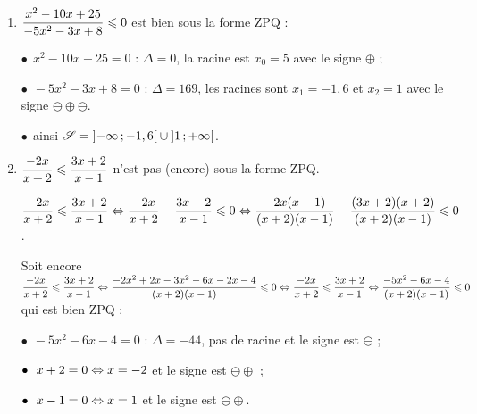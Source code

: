 \documentclass[a4paper,11pt]{article}
\begin{document}
\begin{enumerate}
	\item $\dfrac{x^2-10x+25}{-5x^2-3x+8} \leqslant 0$ est bien sous la forme \textsf{ZPQ} :
	
	\tabula{}$\bullet~~x^2-10x+25=0$ : $\Delta=0$, la racine est $x_0=5$ avec le signe $\oplus$ ;
	
	\tabula{}$\bullet~~-5x^2-3x+8=0$ : $\Delta=169$, les racines sont $x_1=-1,6$ et $x_2=1$ avec le signe $\ominus\oplus\ominus$.
	
	\begin{center}
	\end{center}
	
	\tabula{}$\bullet~~$ainsi $\mathscr{S}=\mbox{\ensuremath{\left]-\infty\mathpunct{};-1,6\right[}} \cup \mbox{\ensuremath{\left]1\mathpunct{};+\infty\right[}}$.
	\item $\dfrac{-2x}{x+2} \leqslant \dfrac{3x+2}{x-1}$ n'est pas (encore) sous la forme \textsf{ZPQ}.
	
	$\dfrac{-2x}{x+2} \leqslant \dfrac{3x+2}{x-1} \Leftrightarrow \dfrac{-2x}{x+2}-\dfrac{3x+2}{x-1} \leqslant 0 \Leftrightarrow \dfrac{-2x(x-1)}{(x+2)(x-1)}-\dfrac{(3x+2)(x+2)}{(x+2)(x-1)} \leqslant 0$.
	
	Soit encore $\dfrac{-2x}{x+2} \leqslant \dfrac{3x+2}{x-1} \Leftrightarrow \dfrac{-2x^2+2x-3x^2-6x-2x-4}{(x+2)(x-1)} \leqslant 0 \Leftrightarrow \dfrac{-2x}{x+2} \leqslant \dfrac{3x+2}{x-1} \Leftrightarrow \dfrac{-5x^2-6x-4}{(x+2)(x-1)} \leqslant 0$ qui est bien \textsf{ZPQ} :
	
	\tabula{}$\bullet~~-5x^2-6x-4=0$ : $\Delta=-44$, pas de racine et le signe est $\ominus$ ;
	
	\tabula{}$\bullet~~x+2=0 \Leftrightarrow x=-2$ et le signe est $\ominus\oplus$ ;
	
	\tabula{}$\bullet~~x-1=0 \Leftrightarrow x=1$ et le signe est $\ominus\oplus$.
	

\end{enumerate}
\end{document}
